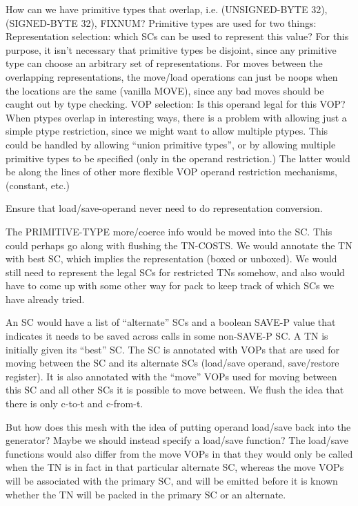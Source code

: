 How can we have primitive types that overlap, i.e. (UNSIGNED-BYTE 32),
(SIGNED-BYTE 32), FIXNUM?
Primitive types are used for two things:
    Representation selection: which SCs can be used to represent this value?
	For this purpose, it isn't necessary that primitive types be disjoint,
	since any primitive type can choose an arbitrary set of
	representations.  For moves between the overlapping representations,
	the move/load operations can just be noops when the locations are the
	same (vanilla MOVE), since any bad moves should be caught out by type
	checking.
    VOP selection:
	Is this operand legal for this VOP?  When ptypes overlap in interesting
	ways, there is a problem with allowing just a simple ptype restriction,
	since we might want to allow multiple ptypes.  This could be handled
	by allowing ``union primitive types'', or by allowing multiple primitive
	types to be specified (only in the operand restriction.)  The latter
	would be along the lines of other more flexible VOP operand restriction
	mechanisms, (constant, etc.)



Ensure that load/save-operand never need to do representation conversion.

The PRIMITIVE-TYPE more/coerce info would be moved into the SC.  This could
perhaps go along with flushing the TN-COSTS.  We would annotate the TN with
best SC, which implies the representation (boxed or unboxed).  We would still
need to represent the legal SCs for restricted TNs somehow, and also would have to
come up with some other way for pack to keep track of which SCs we have already
tried.

An SC would have a list of ``alternate'' SCs and a boolean SAVE-P value that
indicates it needs to be saved across calls in some non-SAVE-P SC.  A TN is
initially given its ``best'' SC.  The SC is annotated with VOPs that are used for
moving between the SC and its alternate SCs (load/save operand, save/restore
register).  It is also annotated with the ``move'' VOPs used for moving between
this SC and all other SCs it is possible to move between.  We flush the idea
that there is only c-to-t and c-from-t.

But how does this mesh with the idea of putting operand load/save back into the
generator?  Maybe we should instead specify a load/save function?  The
load/save functions would also differ from the move VOPs in that they would
only be called when the TN is in fact in that particular alternate SC, whereas
the move VOPs will be associated with the primary SC, and will be emitted
before it is known whether the TN will be packed in the primary SC or an
alternate.

